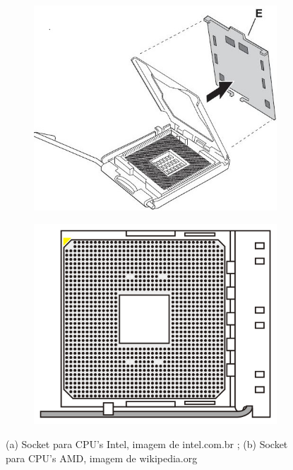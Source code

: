 \begin{enumerate}
	\begin{figure}[H]
		\centering
		\begin{subfigure}[t]{0.45\textwidth}
			\centering
			\includegraphics[scale=0.5]{./intelsocket.jpeg}
			\caption{}
			\label{fig.intelsocket}
		\end{subfigure}
		\begin{subfigure}[t]{0.45\textwidth}
			\centering
			{\includegraphics[scale=0.1]{./amdsocket.png}}
			\caption{}
			\label{fig.amdsocket}
			\end{subfigure}	
		\caption{(a) Socket para CPU's Intel, imagem de intel.com.br ; (b) Socket para CPU's AMD, imagem de wikipedia.org }
		\label{fig.sockets}
	\end{figure}	
	

\end{enumerate}
